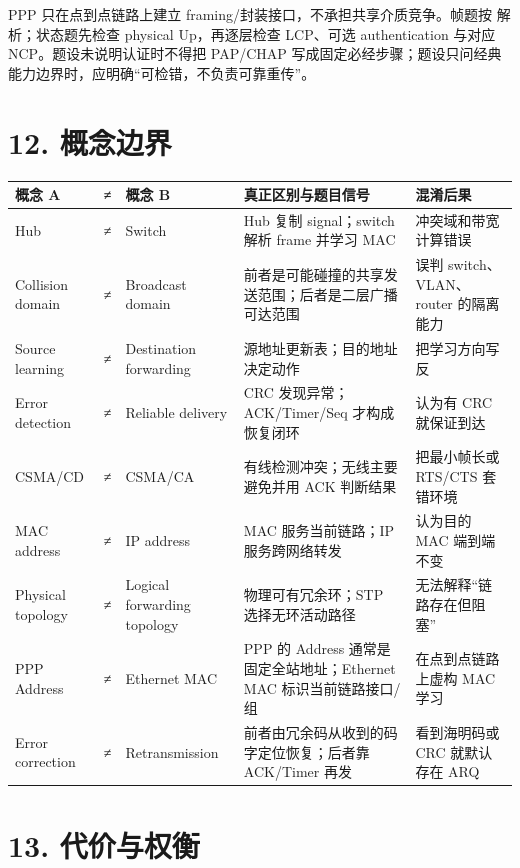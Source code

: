 \documentclass[UTF8,fontset=none,11pt,a4paper]{ctexart}
\begin{document}
PPP 只在点到点链路上建立 framing/封装接口，不承担共享介质竞争。帧题按  解析；状态题先检查 physical Up，再逐层检查 LCP、可选 authentication 与对应 NCP。题设未说明认证时不得把 PAP/CHAP 写成固定必经步骤；题设只问经典能力边界时，应明确“可检错，不负责可靠重传”。

\section{12. 概念边界}\label{9-ux6982ux5ff5ux8fb9ux754c}

\begin{longtable}[]{@{}lclll@{}}
\toprule\noalign{}
概念 A & ≠ & 概念 B & 真正区别与题目信号 & 混淆后果 \\
\midrule\noalign{}
\endhead
\bottomrule\noalign{}
\endlastfoot
Hub & ≠ & Switch & Hub 复制 signal；switch 解析 frame 并学习 MAC &
冲突域和带宽计算错误 \\
Collision domain & ≠ & Broadcast domain &
前者是可能碰撞的共享发送范围；后者是二层广播可达范围 & 误判
switch、VLAN、router 的隔离能力 \\
Source learning & ≠ & Destination forwarding &
源地址更新表；目的地址决定动作 & 把学习方向写反 \\
Error detection & ≠ & Reliable delivery & CRC 发现异常；ACK/Timer/Seq
才构成恢复闭环 & 认为有 CRC 就保证到达 \\
CSMA/CD & ≠ & CSMA/CA & 有线检测冲突；无线主要避免并用 ACK 判断结果 &
把最小帧长或 RTS/CTS 套错环境 \\
MAC address & ≠ & IP address & MAC 服务当前链路；IP 服务跨网络转发 &
认为目的 MAC 端到端不变 \\
Physical topology & ≠ & Logical forwarding topology &
物理可有冗余环；STP 选择无环活动路径 & 无法解释``链路存在但阻塞'' \\
PPP Address & ≠ & Ethernet MAC & PPP 的 Address 通常是固定全站地址；Ethernet MAC 标识当前链路接口/组 & 在点到点链路上虚构 MAC 学习 \\
Error correction & ≠ & Retransmission & 前者由冗余码从收到的码字定位恢复；后者靠 ACK/Timer 再发 & 看到海明码或 CRC 就默认存在 ARQ \\
\end{longtable}

\section{13. 代价与权衡}\label{10-ux4ee3ux4ef7ux4e0eux6743ux8861}
\end{document}

